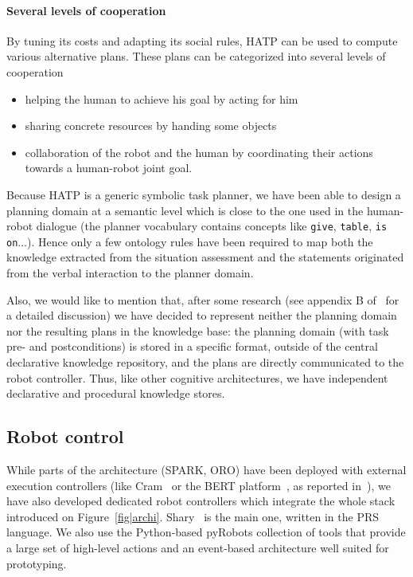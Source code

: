 \documentclass[preprint,3p,times]{elsarticle}
\begin{document}
\paragraph{Several levels of cooperation} 
By tuning its costs
and adapting its social rules, HATP can be used to compute various
alternative plans. These plans can be categorized into several levels
of cooperation

\begin{itemize}
\item helping the human to achieve his goal by acting for him
\item sharing concrete resources by handing some objects
\item collaboration of the robot and the human by coordinating their
  actions towards a human-robot joint goal.
\end{itemize}


Because HATP is a generic symbolic task planner, we have been able to design a
planning domain at a semantic level which is close to the one used in the
human-robot dialogue (the planner vocabulary contains concepts like
\texttt{give}, \texttt{table}, \texttt{is on}...). Hence only a few ontology
rules have been required to map both the knowledge extracted from the situation
assessment and the statements originated from the verbal interaction to the
planner domain.

Also, we would like to mention that, after some research (see appendix B
of~\cite{Lemaignan2012a} for a detailed discussion)  we have decided to
represent neither the planning domain nor the resulting plans in the knowledge
base: the planning domain (with task pre- and postconditions) is stored in a
specific format, outside of the central declarative knowledge repository, and
the plans are directly communicated to the robot controller. Thus, like other
cognitive architectures, we have independent declarative and procedural
knowledge stores.


\subsection{Robot control}
\label{sect|ctrl}

While parts of the architecture (SPARK, ORO) have been deployed with external
execution controllers (like {\sc Cram}~\cite{Beetz2010} or the BERT
platform~\cite{Lallee2010b}, as reported in~\cite{Lemaignan2010}), we have also
developed dedicated robot controllers which integrate the whole stack introduced
on Figure~\ref{fig|archi}. {\sc Shary}~\cite{clodic2008shary} is the main one,
written in the PRS~\cite{Ingrand1996} language. We also use the Python-based
{\sc pyRobots} collection of tools that provide a large set of high-level
actions and an event-based architecture well suited for prototyping.
\end{document}
